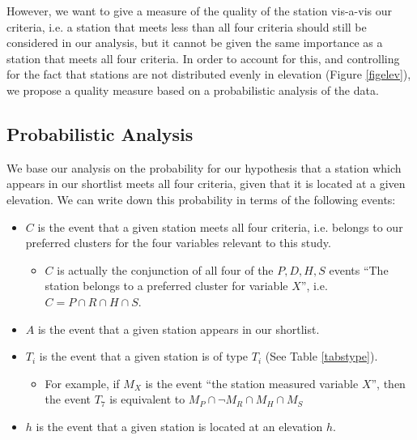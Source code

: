 \documentclass[12pt]{iopart}
\begin{document}
However, we want to give a measure of the quality of the station vis-a-vis our criteria, i.e. a station that meets less than all four criteria should still be considered in our analysis, but it cannot be given the same importance as a station that meets all four criteria. In order to account for this, and controlling for the fact that stations are not distributed evenly in elevation (Figure \ref{figelev}), we propose a quality measure based on a probabilistic analysis of the data.

\subsection{Probabilistic Analysis}

We base our analysis on the probability for our hypothesis that a station which appears in our shortlist meets all four criteria, given that it is located at a given elevation. We can write down this probability in terms of the following events:

\begin{itemize}
\item $C$ is the event that a given station meets all four criteria, i.e. belongs to our preferred clusters for the four variables relevant to this study.
\begin{itemize}
\item $C$ is actually the conjunction of all four of the $P,D,H,S$ events ``The station belongs to a preferred cluster for variable $X$'', i.e. $C=P\cap R\cap H \cap S$.
\end{itemize}
\item $A$ is the event that a given station appears in our shortlist.
\item $T_i$ is the event that a given station is of type $T_i$ (See Table \ref{tabstype}).
\begin{itemize}
\item For example, if $M_X$ is the event ``the station measured variable $X$'', then the event $T_7$ is equivalent to $M_P\cap \neg M_R\cap M_H \cap M_S$
\end{itemize}
\item $h$ is the event that a given station is located at an elevation $h$.
\end{itemize}
\end{document}
